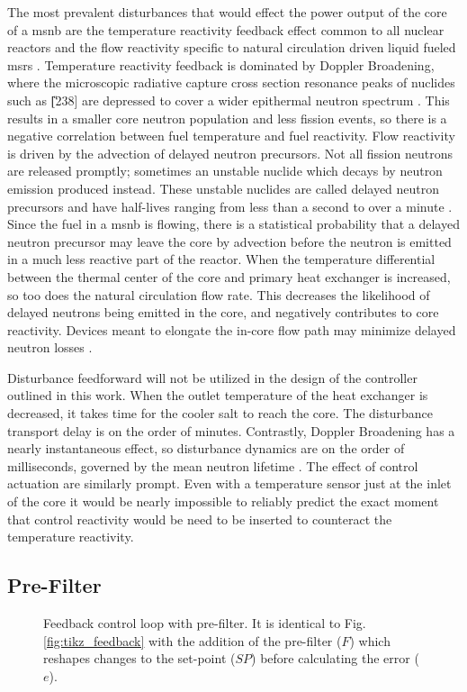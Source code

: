 The most prevalent disturbances that would effect the power output of the core of a \acs{msnb} are the temperature reactivity feedback effect common to all nuclear reactors and the flow reactivity specific to natural circulation driven  liquid fueled \acsp{msr} \cite{CarterNumerical}. Temperature reactivity feedback is dominated by Doppler Broadening, where the microscopic radiative capture cross section resonance peaks of nuclides such as \U[238] are depressed to cover a wider epithermal neutron spectrum \cite{DH}. This results in a smaller core neutron population and less fission events, so there is a negative correlation between fuel temperature and fuel reactivity. Flow reactivity is driven by the advection of delayed neutron precursors. Not all fission neutrons are released promptly; sometimes an unstable nuclide which decays by neutron emission produced instead. These unstable nuclides are called delayed neutron precursors and have half-lives ranging from less than a second to over a minute \cite{Lamarsh}. Since the fuel in a \acs{msnb} is flowing, there is a statistical probability that a delayed neutron precursor may leave the core by advection before the neutron is emitted in a much less reactive part of the reactor. When the temperature differential between the thermal center of the core and primary heat exchanger is increased, so too does the natural circulation flow rate. This decreases the likelihood of delayed neutrons being emitted in the core, and negatively contributes to core reactivity. Devices meant to elongate the in-core flow path may minimize delayed neutron losses \cite{CarterPHD}.

Disturbance feedforward will not be utilized in the design of the controller outlined in this work. When the outlet temperature of the heat exchanger is decreased, it takes time for the cooler salt to reach the core. The disturbance transport delay is on the order of minutes. Contrastly, Doppler Broadening has a nearly instantaneous effect, so disturbance dynamics are on the order of milliseconds, governed by the mean neutron lifetime \cite{DH,Lamarsh}. The effect of control actuation are similarly prompt. Even with a temperature sensor just at the inlet of the core it would be nearly impossible to reliably predict the exact moment that control reactivity would be need to be inserted to counteract the temperature reactivity. 

\subsection{Pre-Filter}
\begin{figure}[h!]
    \centering
    
    \caption[Feedback control loop with pre-filter]{Feedback control loop with pre-filter. It is identical to Fig. \ref{fig:tikz_feedback} with the addition of the pre-filter ($F$) which reshapes changes to the set-point ($SP$) before calculating the error ($e$).}
    \label{fig:tikz_prefilter}
\end{figure}

